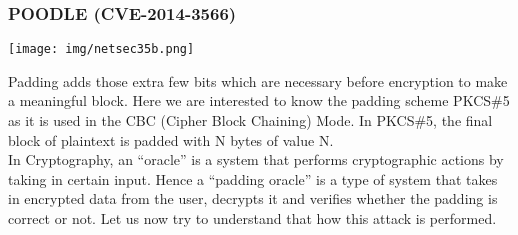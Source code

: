 \documentclass[a4paper, 10pt, titlepage]{article}
\begin{document}
\subsubsection{POODLE (CVE-2014-3566)}
\begin{center}
	\texttt{[image: img/netsec35b.png]}
\end{center}
Padding adds those extra few bits which are necessary before encryption to make a meaningful block. Here we are interested to know the padding scheme PKCS\#5 as it is used in the CBC (Cipher Block Chaining) Mode.
In PKCS\#5, the final block of plaintext is padded with N
bytes of value N. \\
In Cryptography, an “oracle” is a system that performs cryptographic actions by taking in certain input. Hence a “padding oracle” is a type of system that takes in encrypted data from the user, decrypts it and verifies whether the padding is correct or not. Let us now try to understand that how this attack is performed.
\end{document}
